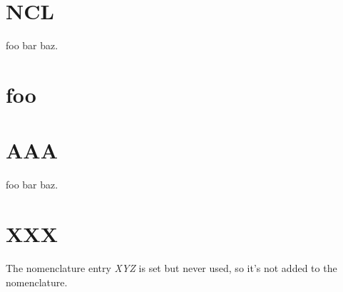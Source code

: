 \documentclass[12pt,oneside]{scrartcl}
\begin{document}
\printnomenclature
\newpage



%

\section{NCL}



foo bar  baz.

%

\section{foo}



%

\section{AAA}




foo bar  baz.

%

\section{XXX}

The nomenclature entry \emph{XYZ} is set but never used, so it's not added to the nomenclature.
\end{document}
